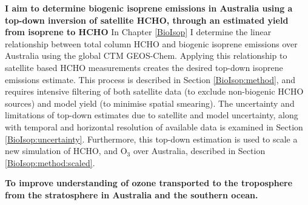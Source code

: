  \textbf{I aim to determine biogenic isoprene emissions in Australia using a top-down inversion of satellite HCHO, through an estimated yield from isoprene to HCHO}
  In Chapter \ref{BioIsop} I determine the linear relationship between total column HCHO and biogenic isoprene emissions over Australia using the global CTM GEOS-Chem.
  Applying this relationship to satellite based HCHO measurements creates the desired top-down isoprene emissions estimate.
  This process is described in Section \ref{BioIsop:method}, and requires intensive filtering of both satellite data (to exclude non-biogenic HCHO sources) and model yield (to minimise spatial smearing).
  The uncertainty and limitations of top-down estimates due to satellite and model uncertainty, along with temporal and horizontal resolution of available data is examined in Section \ref{BioIsop:uncertainty}.
  Furthermore, this top-down estimation is used to scale a new simulation of HCHO, and O$_3$ over Australia, described in Section \ref{BioIsop:method:scaled}.
   
  \textbf{To improve understanding of ozone transported to the troposphere from the stratosphere in Australia and the southern ocean.}

